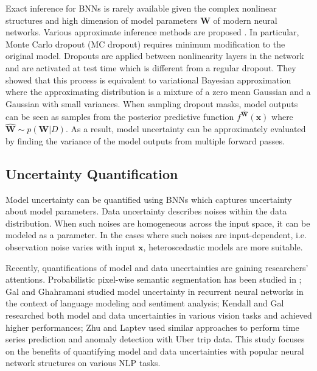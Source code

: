 \documentclass[letterpaper]{article} %
\newcommand{\vect}[1]{\mathbf{#1}}
\newcommand{\matr}[1]{\mathbf{#1}}
\newcommand{\vx}[0]{\vect{x}}
\newcommand{\mW}[0]{\matr{W}}
\begin{document}
Exact inference for BNNs is rarely available given the complex nonlinear structures and high dimension of model parameters $\mW$ of modern neural networks. Various approximate inference methods are proposed \cite{graves2011practical,hernandez2015probabilistic,blundell2015weight,gal2016dropout}. In particular, Monte Carlo dropout (MC dropout) \cite{gal2016dropout} requires minimum modification to the original model. Dropouts are applied between nonlinearity layers in the network and are activated at test time which is different from a regular dropout. They showed that this process is equivalent to variational Bayesian approximation where the approximating distribution is a mixture of a zero mean Gaussian and a Gaussian with small variances. When sampling dropout masks, model outputs can be seen as samples from the posterior predictive function $f^{\widehat{\mW}}(\vx)$ where $\widehat{\mW}\sim p(\mW|D)$. As a result, model uncertainty can be approximately evaluated by finding the variance of the model outputs from multiple forward passes.

\subsection{Uncertainty Quantification}
Model uncertainty can be quantified using BNNs which captures uncertainty about model parameters. Data uncertainty describes noises within the data distribution. When such noises are homogeneous across the input space, it can be modeled as a parameter. In the cases where such noises are input-dependent, i.e. observation noise varies with input $\vx$, heteroscedastic models \cite{nix1994estimating,le2005heteroscedastic} are more suitable. 

Recently, quantifications of model and data uncertainties are gaining researchers' attentions. Probabilistic pixel-wise semantic segmentation has been studied in \cite{kendall2015bayesian}; Gal and Ghahramani  studied model uncertainty in recurrent neural networks in the context of language modeling and sentiment analysis; Kendall and Gal  researched both model and data uncertainties in various vision tasks and achieved higher performances; Zhu and Laptev  used similar approaches to perform time series prediction and anomaly detection with Uber trip data. This study focuses on the benefits of quantifying model and data uncertainties with popular neural network structures on various NLP tasks.
\end{document}
